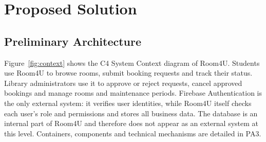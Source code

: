 \section{Proposed Solution}

\subsection{Preliminary Architecture}

Figure~\ref{fig:context} shows the C4 System Context diagram of Room4U.
Students use Room4U to browse rooms, submit booking requests and track
their status. Library administrators use it to approve or reject requests,
cancel approved bookings and manage rooms and maintenance periods.
Firebase Authentication is the only external system: it verifies user
identities, while Room4U itself checks each user's role and permissions and
stores all business data. The database is an internal part of Room4U and
therefore does not appear as an external system at this level. Containers,
components and technical mechanisms are detailed in PA3.

